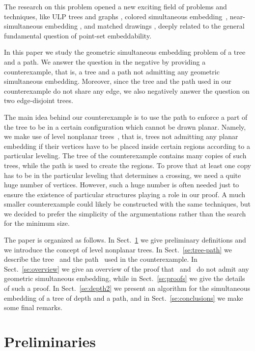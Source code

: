 \documentclass[a4paper,10pt]{llncs}
\newcommand{\T}{\mbox{ }}
\renewcommand{\P}{\mbox{ }}
\begin{document}
The research on this problem opened a new exciting field of problems and techniques, like ULP trees and graphs \cite{efk-culpt-06,fk-culpg-07,fk-mlnpt-07}, colored simultaneous embedding~\cite{g-csge-07}, near-simultaneous embedding \cite{fkk-csnse-07}, and matched drawings \cite{gdkls-mdpg-07}, deeply
related to the general fundamental question of point-set embeddability.

In this paper we study the geometric simultaneous embedding problem of a tree and a path. We answer the question in the negative by providing a counterexample, that is, a tree and a path not admitting any geometric simultaneous embedding. Moreover, since the tree and the path used in our counterexample do not share any edge, we also negatively answer the question on two edge-disjoint trees.

The main idea behind our counterexample is to use the path to enforce a part of the tree to be in a certain configuration which cannot be drawn planar. Namely, we make use of level nonplanar trees~\cite{efk-culpt-06,fk-mlnpt-07}, that is, trees not admitting any planar embedding if their vertices have to be placed inside certain regions according to a particular leveling. The tree of the counterexample contains many copies of such trees, while the path is used to create the regions. To prove that at least one copy has to be in the particular leveling that determines a crossing, we need a quite huge number of vertices. However, such a huge number is often needed just to ensure the existence of particular structures playing a role in our proof. A much smaller counterexample could likely be constructed with the same techniques, but we decided to prefer the simplicity of the argumentations rather than the search for the minimum size.

The paper is organized as follows. In Sect.~\ref{se:preliminaries} we give preliminary definitions and we introduce the concept of level nonplanar trees. In Sect.~\ref{se:tree-path} we describe the tree \T and the path \P used in the counterexample. In Sect.~\ref{se:overview} we give an overview of the proof that \T and \P do not admit any geometric simultaneous embedding, while in Sect.~\ref{se:proofs} we give the details of such a proof. In Sect.~\ref{se:depth2} we present an algorithm for the simultaneous embedding of a tree of depth  and a path, and in Sect.~\ref{se:conclusions} we make some final remarks.



\section{Preliminaries}\label{se:preliminaries}
\end{document}
